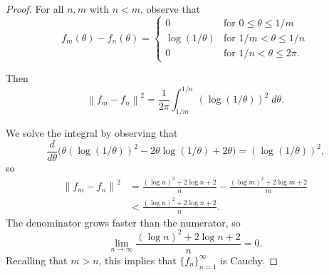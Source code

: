 \documentclass[oneside]{article}
\newcommand\norm[1]{\left\|#1\right\|}
\begin{document}
  \begin{proof}
    For all $n, m$ with $n < m$, observe that \[
      f_m(\theta) - f_n(\theta)
      = \begin{cases}
        0 &\text{for }0 \leq \theta \leq 1/m \\
        \log(1/\theta) &\text{for }1/m < \theta \leq 1/n \\
        0 &\text{for }1/n < \theta \leq 2\pi \text{.}
      \end{cases}
    \]

    Then \[
      \norm{f_m - f_n}^2
      = \frac1{2\pi}\int_{1/m}^{1/n} (\log(1/\theta))^2\;d\theta \text{.}
    \]

    We solve the integral by observing that \[
      \frac{d}{d\theta}\Big( \theta(\log(1/\theta))^2 - 2 \theta \log (1/\theta) + 2 \theta \Big) = (\log (1/\theta))^2 \text{,}
    \] so \begin{align*}
      \norm{f_m - f_n}^2
      &= \frac{(\log n)^2 + 2 \log n + 2}{n} - \frac{(\log m)^2 + 2 \log m + 2}{m} \\
      &< \frac{(\log n)^2 + 2 \log n + 2}{n} \text{.}
    \end{align*} The denominator grows faster than the numerator, so \[
      \lim_{n\to \infty} \frac{(\log n)^2 + 2 \log n + 2}{n} = 0 \text{.}
    \] Recalling that $m > n$, this implies that $\{f_n\}_{n=1}^\infty$ is Cauchy.
  \end{proof}
\end{document}
